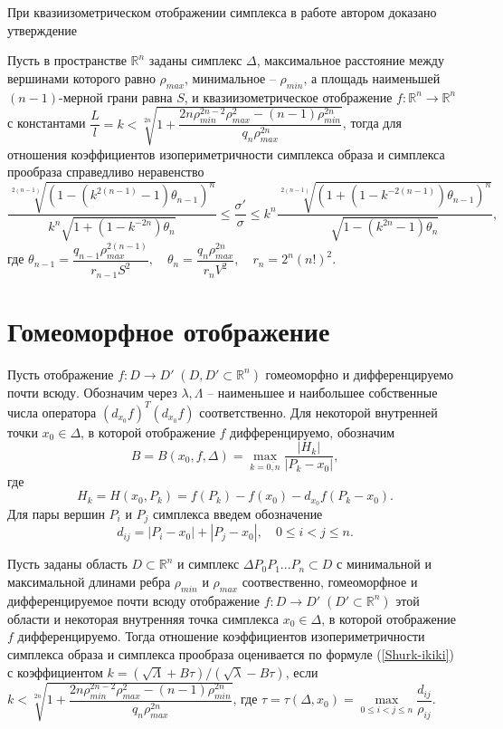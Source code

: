 \documentclass[a4paper,11pt,twoside]{article}
\begin{document}
При квазиизометрическом отображении симплекса в работе \cite{Shur-KlSh} автором доказано утверждение
\begin{thm} Пусть в пространстве $\mathbb{R}^n$ заданы симплекс $\Delta$, максимальное расстояние между вершинами которого равно $\rho_{max}$, минимальное -- $\rho_{min}$, а площадь наименьшей $(n-1)$-мерной грани равна $S$, и квазиизометрическое отображение $f: \mathbb{R}^n \to \mathbb{R}^n$ с константами $\dfrac{L}{l}=k < \sqrt[2n]{1+\dfrac{2n\rho_{min}^{2n-2}\rho_{max}^2-(n-1)\rho_{min}^{2n}}{q_n\rho_{max}^{2n}}}$, тогда для отношения коэффициентов изопериметричности симплекса образа и симплекса прообраза справедливо неравенство
\begin{equation}
\dfrac{\sqrt[2(n-1)]{\left( {1-(k^{2(n-1)}-1) \theta_{n-1}}\right) ^n}}{k^n\sqrt{1+ \left(1-k^{-2n} \right) \theta_n}} \leqslant \dfrac{\sigma'}{\sigma} \leqslant
k^n \dfrac{\sqrt[2(n-1)]{\left( {1+(1-k^{-2(n-1)}) \theta_{n-1}}\right) ^n}}{\sqrt{1- \left(k^{2n}-1 \right) \theta_n}}, \label{Shurk-ikiki}
\end{equation}
где $\theta_{n-1}=\dfrac{q_{n-1}\rho_{max}^{2(n-1)}}{r_{n-1}S^2}, \quad 
\theta_n = \dfrac{q_n \rho_{max}^{2n}}{r_nV^2}, \quad r_n=2^n(n!)^2$. 
\end{thm}

\section{Гомеоморфное отображение}
Пусть отображение $ f:D\rightarrow D' \; ( D, D' \subset \mathbb{R}^n)$ гомеоморфно и дифференцируемо почти всюду. Обозначим через
$\lambda, \Lambda$ -- наименьшее и наибольшее собственные числа оператора $(d_{x_0}f)^T (d_{x_0}f)$ соответственно. Для некоторой внутренней точки $x_0 \in \Delta$, в которой отображение $f$ дифференцируемо, обозначим
$$B = B(x_0, f, \Delta)=\max_{k=\overline{0,n}} \dfrac{|H_k|}{|P_k-x_0|},$$
где
$$ H_k=H(x_0,P_k)=f(P_k)-f(x_0)-d_{x_0}f(P_k-x_0). $$
Для пары вершин $P_i$ и $P_j$ симплекса введем обозначение
$$d_{ij}=|P_i-x_0|+|P_j-x_0|, \quad 0\leqslant i < j \leqslant n. $$
	
\begin{lem}
Пусть заданы область $ D \subset \mathbb{R}^n$ и симплекс $ \Delta P_0P_1...P_n \subset D$ с минимальной и максимальной длинами ребра $\rho_{min}$ и $\rho_{max}$ соотвественно, гомеоморфное и дифференцируемое почти всюду отображение $ f:D\rightarrow D' \; ( D' \subset \mathbb{R}^n)$ этой области и некоторая внутренняя точка симплекса $ x_0 \in \Delta $, в которой отображение $f$ дифференцируемо. 
Тогда отношение коэффициентов изопериметричности симплекса образа и симплекса прообраза оценивается по формуле (\ref{Shurk-ikiki}) с коэффициентом $k=\left(\sqrt{\Lambda}+ B \tau \right) / \left(\sqrt{\lambda}- B \tau \right)$, если 
$k < \sqrt[2n]{1+\dfrac{2n\rho_{min}^{2n-2}\rho_{max}^2-(n-1)\rho_{min}^{2n}}{q_n\rho_{max}^{2n}}}$, где $\tau =\tau(\Delta, x_0)= \max\limits_{0 \leqslant i < j \leqslant n} \dfrac{d_{ij}}{\rho_{ij}}$.
\end{lem}
	
\end{document}
